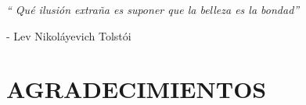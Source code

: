 \documentclass[a4paper, 11pt, spanish, twoside]{article}
\newcommand\blankpage{%
    \null
    \thispagestyle{empty}%
    \newpage}
\begin{document}
 




\newpage
\thispagestyle{empty}







 
\newpage
\thispagestyle{empty}

\begin{flushright} %
\vspace*{5cm} %

\textit{“  Qué ilusión extraña es suponer que la belleza es la bondad”} 

\medskip %
- Lev Nikoláyevich Tolstói 

\end{flushright}

\afterpage{\blankpage} %




\newpage
\thispagestyle{plain}

\section*{AGRADECIMIENTOS} %
\end{document}
